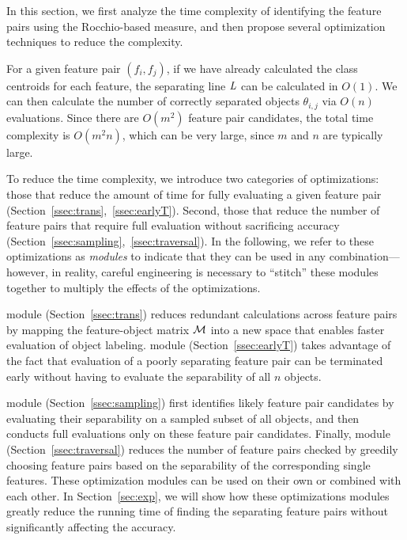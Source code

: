 In this section, we first analyze the time complexity of identifying the \topk feature pairs using the Rocchio-based measure, and then propose several optimization techniques to reduce the complexity.

 For a given feature pair $(f_i, f_j)$, if we have already calculated the class centroids for each feature, the separating line $\mathit{L}$ can be calculated in $O(1)$. We can then calculate the number of correctly separated objects $\theta_{i,j}$ via $O(n)$ evaluations. Since there are $O(m^2)$ feature pair candidates, the total time complexity is $O(m^2n)$, which can be very large,
since $m$ and $n$ are typically large.

 To reduce the time complexity, we introduce two categories of optimizations:
those that reduce the amount of time
for fully evaluating a given feature pair (Section~\ref{ssec:trans},~\ref{ssec:earlyT}).
Second, those that reduce the number of feature pairs
that require full evaluation without
sacrificing accuracy (Section~\ref{ssec:sampling},~\ref{ssec:traversal}).
In the following, we refer to these optimizations as {\em modules} to indicate that they
can be used in any combination---however, in reality, careful engineering is necessary
to ``stitch'' these modules together to multiply the effects of the optimizations.

\trans module (Section~\ref{ssec:trans}) reduces redundant calculations across feature pairs by mapping the feature-object matrix ${\mathcal{M}}$ into a new space that enables faster evaluation of object labeling. \earlyT module (Section~\ref{ssec:earlyT}) takes advantage of the fact that evaluation of a poorly separating feature pair can be terminated early without having to evaluate the separability of all $n$ objects.

\sampling module
(Section~\ref{ssec:sampling}) first identifies likely \topk feature pair candidates by evaluating their separability on a sampled subset of all objects, and then conducts full evaluations only on these feature pair candidates.
Finally, \traversal module (Section~\ref{ssec:traversal})
reduces the number of feature pairs checked by greedily
choosing feature pairs based on the separability of the
corresponding single features. These optimization modules can be used on their own or combined with each other.
In Section~\ref{sec:exp}, we will show how these optimizations modules greatly reduce the running time of finding the \topk separating feature pairs without significantly affecting the accuracy.

